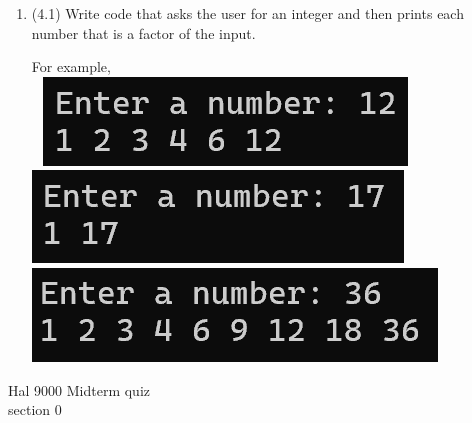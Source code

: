 \documentclass{article}
\begin{document}
\begin{enumerate}
\item (4.1)  
		Write code that asks the user for an integer and then prints each number that is a 
		factor of the input.
	
		For example, \\ \ \hfill
		\includegraphics[height = .35in]{./imgs/factors1.PNG} \hfill  
		\includegraphics[height = .35in]{./imgs/factors2.PNG} \hfill  
		\includegraphics[height = .35in]{./imgs/factors3.PNG} \hfill \


\end{enumerate}
\pagebreak
Hal 9000 \hfill Midterm quiz\\
section 0\\
\end{document}
